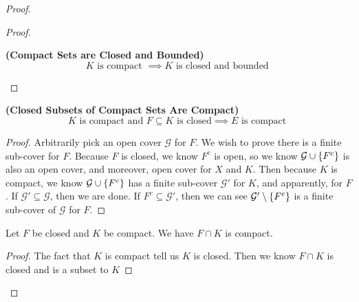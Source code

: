 \documentclass{report}
\begin{document}
\begin{proof}
\begin{proof}
\begin{corollary}
\label{1.11.6}
\textbf{(Compact Sets are Closed and Bounded)}
\begin{equation}
K\text{ is compact }\implies K\text{ is closed and bounded }
\end{equation}
\end{corollary}
\end{proof}
\begin{theorem}
\label{1.11.7}
\textbf{(Closed Subsets of Compact Sets Are Compact)} 
\begin{equation}
\text{$K$ is compact and  $F\subseteq K$ is closed}\implies E\text{ is compact }
\end{equation}
\end{theorem}
\begin{proof}
Arbitrarily pick an open cover $\mathcal{G}$ for $F$. We wish to prove there is a finite sub-cover for $F$. Because $F$ is closed, we know $F^c$ is open, so we know  $\mathcal{G}\cup \{ F^c \}$ is also an open cover, and moreover, open cover for $X$ and $K$. Then because $K$ is compact, we know $\mathcal{G}\cup \{ F^c \}$ has a finite sub-cover $\mathcal{G}'$ for $K$, and apparently, for $F$. If  $\mathcal{G}'\subseteq \mathcal{G}$, then we are done. If $F^c\subseteq \mathcal{G}'$, then we can see $\mathcal{G}'\setminus \{ F^c \}$ is a finite sub-cover of $\mathcal{G}$ for $F$.
\end{proof}
\begin{corollary}
\label{1.11.8}
Let $F$ be closed and  $K$ be compact. We have $F\cap K$ is compact.
\end{corollary}
\begin{proof} 
The fact that  $K$ is compact tell us $K$ is closed. Then we know $F\cap K$ is closed and is a subset to $K$
\end{proof}

\end{proof}
\end{document}
